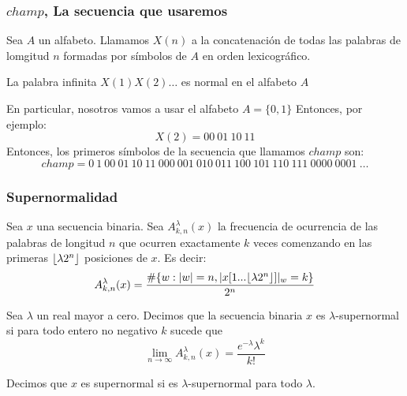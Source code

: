 \documentclass[10pt,mathserif]{beamer}%
\begin{document}
\begin{frame}
\frametitle{$champ$, La secuencia que usaremos}
  

  \begin{theorem}
    Sea $A$ un alfabeto. Llamamos  $X(n)$ a la concatenación de todas las palabras de lomgitud $n$ formadas por símbolos de $A$ en orden lexicográfico.
    
    La palabra infinita $X(1)X(2)\dots$ es normal en el alfabeto $A$
  \end{theorem}

  \medskip
  \pause
  En particular, nosotros vamos a usar el alfabeto  $A=\{0,1\}$ Entonces, por ejemplo:
  $$X(2) = 00 \: 01 \: 10 \: 11$$
  \medskip
  \pause
  Entonces, los primeros símbolos de la secuencia que llamamos $champ$ son:
  $$champ = 0 \: 1 \: 00 \: 01 \: 10 \: 11 \: 000 \: 001 \: 010 \: 011 \: 100 \: 101 \: 110 \: 111 \: 0000 \: 0001 \: \dots$$


\end{frame}

\begin{frame}
\frametitle{Supernormalidad}
Sea $x$ una secuencia binaria. Sea $A^\lambda_{k,n}(x)$  la frecuencia de ocurrencia de las palabras de longitud $n$ que ocurren exactamente $k$ veces comenzando en las primeras $\lfloor \lambda 2^n \rfloor$ posiciones de $x$. Es decir:
$$A^\lambda_{k,n}(x) = \frac{\#\{w: |w| = n  , |x[1...\lfloor \lambda 2^n \rfloor]|_w = k\}}{2^n}$$
\pause
\begin{definition}
  Sea $\lambda$ un real mayor a cero. Decimos que la secuencia binaria $x$ es $\lambda$-supernormal si para todo entero no negativo $k$ sucede que
  $$\lim_{n\to\infty} A^\lambda_{k,n}(x) = \frac{e^{-\lambda}\lambda^k}{k!}$$

  Decimos que $x$ es supernormal si es $\lambda$-supernormal para todo $\lambda.$
\end{definition}
\end{frame}
\end{document}
